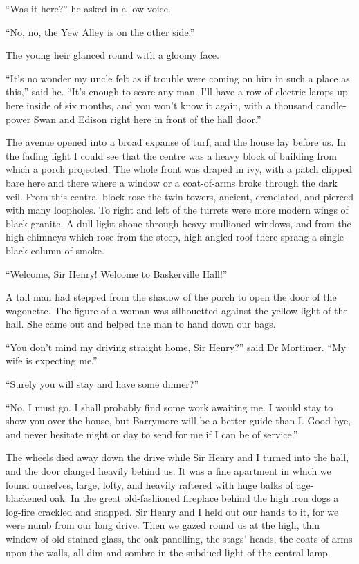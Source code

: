 \documentclass[paper=5.5in:8.5in,BCOR=7mm,twoside,DIV=calc,12pt,usegeometry,openany,chapterprefix,endperiod,headings=big]{scrbook} %
\begin{document}
\enquote{Was it here?} he asked in a low voice.

\enquote{No, no, the Yew Alley is on the other side.}

The young heir glanced round with a gloomy face.

\enquote{It's no wonder my uncle felt as if trouble were coming on him in such a place as this,} said he. \enquote{It's enough to scare any man. I'll have a row of electric lamps up here inside of six months, and you won't know it again, with a thousand candle-power Swan and Edison right here in front of the hall door.}

The avenue opened into a broad expanse of turf, and the house lay before us. In the fading light I could see that the centre was a heavy block of building from which a porch projected. The whole front was draped in ivy, with a patch clipped bare here and there where a window or a coat-of-arms broke through the dark veil. From this central block rose the twin towers, ancient, crenelated, and pierced with many loopholes. To right and left of the turrets were more modern wings of black granite. A dull light shone through heavy mullioned windows, and from the high chimneys which rose from the steep, high-angled roof there sprang a single black column of smoke.

\enquote{Welcome, Sir Henry! Welcome to Baskerville Hall!}

A tall man had stepped from the shadow of the porch to open the door of the wagonette. The figure of a woman was silhouetted against the yellow light of the hall. She came out and helped the man to hand down our bags.

\enquote{You don't mind my driving straight home, Sir Henry?} said Dr Mortimer. \enquote{My wife is expecting me.}

\enquote{Surely you will stay and have some dinner?}

\enquote{No, I must go. I shall probably find some work awaiting me. I would stay to show you over the house, but Barrymore will be a better guide than I. Good-bye, and never hesitate night or day to send for me if I can be of service.}

The wheels died away down the drive while Sir Henry and I turned into the hall, and the door clanged heavily behind us. It was a fine apartment in which we found ourselves, large, lofty, and heavily raftered with huge balks of age-blackened oak. In the great old-fashioned fireplace behind the high iron dogs a log-fire crackled and snapped. Sir Henry and I held out our hands to it, for we were numb from our long drive. Then we gazed round us at the high, thin window of old stained glass, the oak panelling, the stags' heads, the coats-of-arms upon the walls, all dim and sombre in the subdued light of the central lamp.
\end{document}

